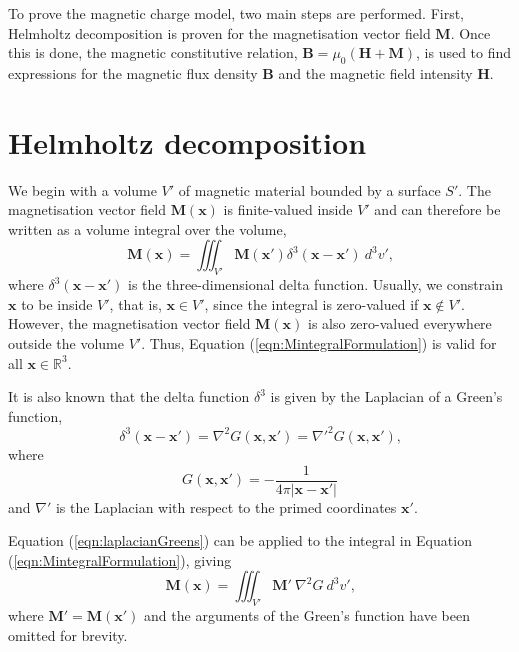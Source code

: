 To prove the magnetic charge model, two main steps are performed. First, Helmholtz decomposition is proven for the magnetisation vector field \(\mathbf{M}\). Once this is done, the magnetic constitutive relation, \(\mathbf{B} = \mu_0 \left(\mathbf{H} + \mathbf{M}\right)\), is used to find expressions for the magnetic flux density \(\mathbf{B}\) and the magnetic field intensity \(\mathbf{H}\).

\section*{Helmholtz decomposition}
We begin with a volume \(V'\) of magnetic material bounded by a surface \(S'\). The magnetisation vector field \(\mathbf{M}\left(\mathbf{x}\right)\) is finite-valued inside \(V'\) and can therefore be written as a volume integral over the volume,
\begin{equation}\label{eqn:MintegralFormulation}
    \mathbf{M}\left(\mathbf{x}\right) = \iiint_{V'} \mathbf{M}\left(\mathbf{x}'\right) \delta^3 \left(\mathbf{x}-\mathbf{x}'\right)\ d^3v' \text{,}
\end{equation}
where \(\delta^3\left(\mathbf{x}-\mathbf{x}'\right)\) is the three-dimensional delta function. Usually, we constrain \(\mathbf{x}\) to be inside \(V'\), that is, \(\mathbf{x} \in V'\), since the integral is zero-valued if \(\mathbf{x} \notin V'\). However, the magnetisation vector field \(\mathbf{M}\left(\mathbf{x}\right)\) is also zero-valued everywhere outside the volume \(V'\). Thus, Equation (\ref{eqn:MintegralFormulation}) is valid for all \(\mathbf{x} \in \mathbb{R}^3\).

It is also known that the delta function \(\delta^3\) is given by the Laplacian of a Green's function,
\begin{equation}\label{eqn:laplacianGreens}
    \delta^3\left(\mathbf{x}-\mathbf{x}'\right) = \nabla^2 G\left(\mathbf{x},\mathbf{x}'\right) = \nabla'^2 G\left(\mathbf{x},\mathbf{x}'\right) \text{,}
\end{equation}
where
\begin{equation}\label{eqn:greensFunction}
    G\left(\mathbf{x},\mathbf{x}'\right) = -\frac{1}{4\pi\left| \mathbf{x}-\mathbf{x}' \right|}
\end{equation}
and \(\nabla'\) is the Laplacian with respect to the primed coordinates \(\mathbf{x}'\).

Equation (\ref{eqn:laplacianGreens}) can be applied to the integral in Equation (\ref{eqn:MintegralFormulation}), giving
\begin{equation}
    \mathbf{M}\left(\mathbf{x}\right) = \iiint_{V'} \mathbf{M}'\ \nabla^2 G\ d^3v' \text{,}
\end{equation}
where \(\mathbf{M}' = \mathbf{M}\left(\mathbf{x}'\right)\) and the arguments of the Green's function have been omitted for brevity.

